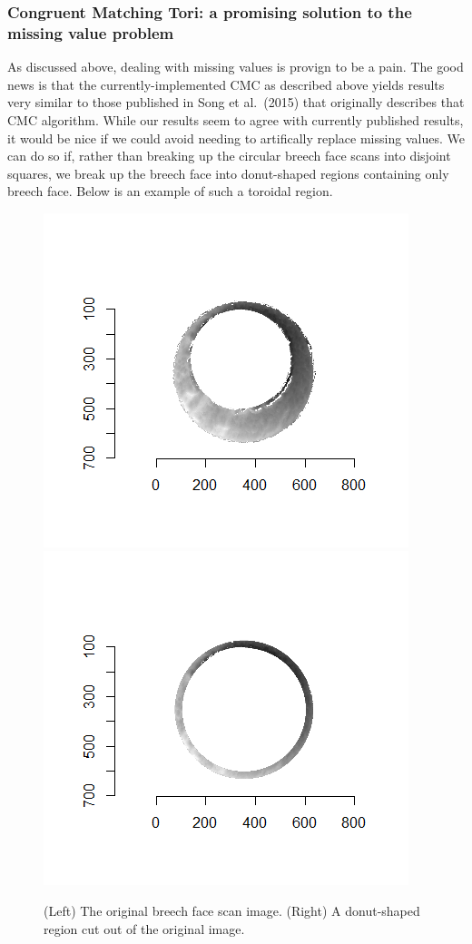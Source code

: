 \documentclass[]{book}
\begin{document}
\hypertarget{congruent-matching-tori-a-promising-solution-to-the-missing-value-problem}{%
\subsubsection{Congruent Matching Tori: a promising solution to the missing value problem}\label{congruent-matching-tori-a-promising-solution-to-the-missing-value-problem}}

As discussed above, dealing with missing values is provign to be a pain. The good news is that the currently-implemented CMC as described above yields results very similar to those published in Song et al.~(2015) that originally describes that CMC algorithm. While our results seem to agree with currently published results, it would be nice if we could avoid needing to artifically replace missing values. We can do so if, rather than breaking up the circular breech face scans into disjoint squares, we break up the breech face into donut-shaped regions containing only breech face. Below is an example of such a toroidal region.

\begin{figure}

{\centering \includegraphics[width=0.5\linewidth]{images/joeZ/im1_original} \includegraphics[width=0.5\linewidth]{images/joeZ/im1_toroidalRegion} 

}

\caption{(Left) The original breech face scan image. (Right) A donut-shaped region cut out of the original image.}\label{fig:unnamed-chunk-10}
\end{figure}
\end{document}
